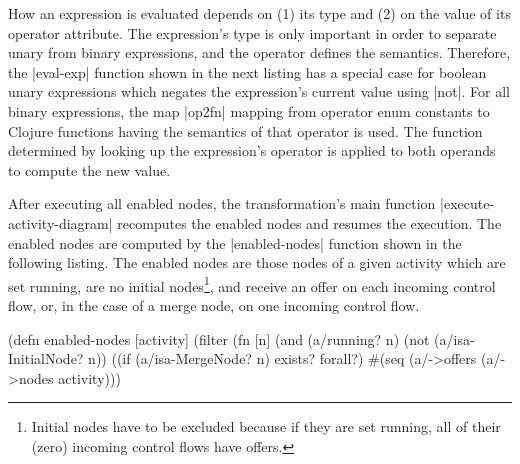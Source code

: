 \documentclass[submission]{eptcs}
\newcommand{\code}{\clojureinline}
\begin{document}
How an expression is evaluated depends on (1) its type and (2) on the value of
its \textsf{operator} attribute.  The expression's type is only important in
order to separate unary from binary expressions, and the operator defines the
semantics.  Therefore, the \code|eval-exp| function shown in the next listing
has a special case for boolean unary expressions which negates the expression's
current value using \code|not|.  For all binary expressions, the map
\code|op2fn| mapping from operator enum constants to Clojure functions having
the semantics of that operator is used.  The function determined by looking up
the expression's operator is applied to both operands to compute the new value.


After executing all enabled nodes, the transformation's main function
\code|execute-activity-diagram| recomputes the enabled nodes and resumes the
execution.  The enabled nodes are computed by the \code|enabled-nodes| function
shown in the following listing.  The enabled nodes are those nodes of a given
activity which are set running, are no initial nodes\footnote{Initial nodes
  have to be excluded because if they are set running, all of their (zero)
  incoming control flows have offers.}, and receive an offer on each incoming
control flow, or, in the case of a merge node, on one incoming control flow.

\begin{clojurecode}
(defn enabled-nodes [activity]
  (filter (fn [n]
            (and (a/running? n)
                 (not (a/isa-InitialNode? n))
                 ((if (a/isa-MergeNode? n) exists? forall?)
                  #(seq (a/->offers %
          (a/->nodes activity)))
\end{clojurecode}
\end{document}
